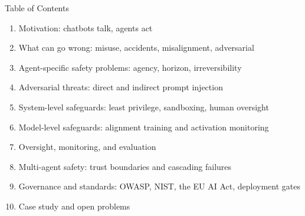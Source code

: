 \begin{frame}{Table of Contents}
  \begin{enumerate}
    \item Motivation: chatbots talk, agents act
    \item What can go wrong: misuse, accidents, misalignment, adversarial
    \item Agent-specific safety problems: agency, horizon, irreversibility
    \item Adversarial threats: direct and indirect prompt injection
    \item System-level safeguards: least privilege, sandboxing, human oversight
    \item Model-level safeguards: alignment training and activation monitoring
    \item Oversight, monitoring, and evaluation
    \item Multi-agent safety: trust boundaries and cascading failures
    \item Governance and standards: OWASP, NIST, the EU AI Act, deployment gates
    \item Case study and open problems
  \end{enumerate}
\end{frame}
